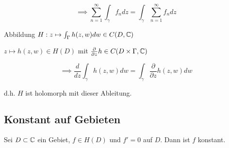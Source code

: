 \vspace*{-2mm}
$$\implies \displaystyle\sum_{n=1}^\infty \int_\gamma f_n dz = \int_\gamma \displaystyle\sum_{n=1}^\infty f_n dz$$

Abbildung $H : z \mapsto \int_\Gamma h(z,w) dw \in C(D,\mathbb{C})$

\spacing

$z \mapsto h(z,w) \in H(D)$ mit $\frac{\partial}{\partial z} h \in C(D \times \Gamma, \mathbb{C})$

\vspace*{-2mm}
$$\implies \frac{d}{dz} \int_\gamma h(z,w) dw = \int_\gamma \frac{\partial}{\partial z} h(z,w) dw$$

d.h. $H$ ist holomorph mit dieser Ableitung.

\subsection*{Konstant auf Gebieten}

Sei $D \subset \mathbb{C}$ ein Gebiet, $f \in H(D)$ und $f'=0$ auf $D$. Dann ist $f$ konstant.
